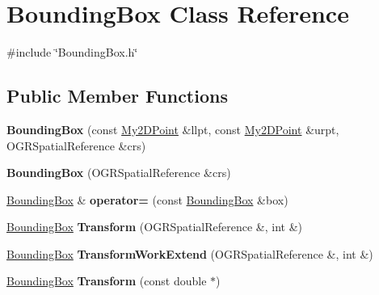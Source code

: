 \hypertarget{classBoundingBox}{
\section{BoundingBox Class Reference}
\label{classBoundingBox}
}


{\ttfamily \#include \char`\"{}BoundingBox.h\char`\"{}}

\subsection*{Public Member Functions}
\begin{DoxyCompactItemize}
\item 
\hypertarget{classBoundingBox_ac29a9cf0d54f524dbd5fc21a0ad99531}{
{\bfseries BoundingBox} (const \hyperlink{classMy2DPoint}{My2DPoint} \&llpt, const \hyperlink{classMy2DPoint}{My2DPoint} \&urpt, OGRSpatialReference \&crs)}
\label{classBoundingBox_ac29a9cf0d54f524dbd5fc21a0ad99531}

\item 
\hypertarget{classBoundingBox_a9f36e24a8cda3853c52aa8748e2bb55f}{
{\bfseries BoundingBox} (OGRSpatialReference \&crs)}
\label{classBoundingBox_a9f36e24a8cda3853c52aa8748e2bb55f}

\item 
\hypertarget{classBoundingBox_ac68c4fc81f66218f7e6a0d531e41f009}{
\hyperlink{classBoundingBox}{BoundingBox} \& {\bfseries operator=} (const \hyperlink{classBoundingBox}{BoundingBox} \&box)}
\label{classBoundingBox_ac68c4fc81f66218f7e6a0d531e41f009}

\item 
\hypertarget{classBoundingBox_a1d585c3b5f7e7f93ceec0e6387111b28}{
\hyperlink{classBoundingBox}{BoundingBox} {\bfseries Transform} (OGRSpatialReference \&, int \&)}
\label{classBoundingBox_a1d585c3b5f7e7f93ceec0e6387111b28}

\item 
\hypertarget{classBoundingBox_ac19b34e1d59267b2fc5065a25dd09344}{
\hyperlink{classBoundingBox}{BoundingBox} {\bfseries TransformWorkExtend} (OGRSpatialReference \&, int \&)}
\label{classBoundingBox_ac19b34e1d59267b2fc5065a25dd09344}

\item 
\hypertarget{classBoundingBox_ab405ce1b745c9d471401681ecfd094d2}{
\hyperlink{classBoundingBox}{BoundingBox} {\bfseries Transform} (const double $\ast$)}
\label{classBoundingBox_ab405ce1b745c9d471401681ecfd094d2}

\end{DoxyCompactItemize}
